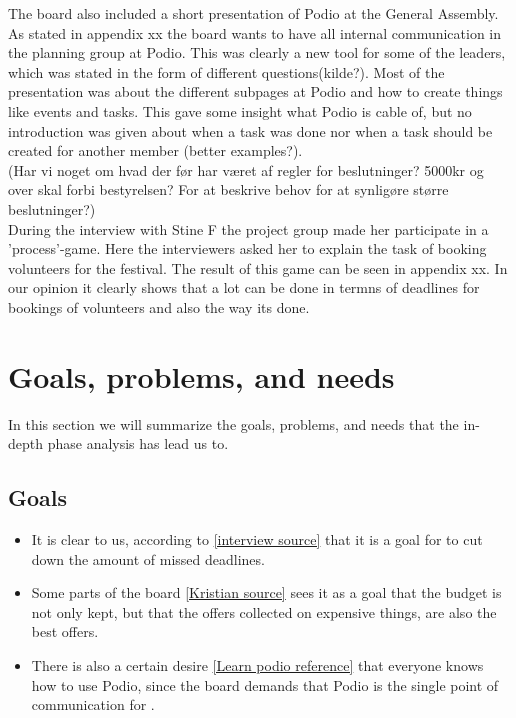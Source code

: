 The board also included a short presentation of Podio at the General Assembly. As stated in appendix xx the board wants to have all internal communication in the planning group at Podio. This was clearly a new tool for some of the leaders, which was stated in the form of different questions(kilde?). Most of the presentation was about the different subpages at Podio and how to create things like events and tasks. This gave some insight what Podio is cable of, but no introduction was given about when a task was done nor when a task should be created for another member (better examples?).\\

(Har vi noget om hvad der før har været af regler for beslutninger? 5000kr og over skal forbi bestyrelsen? For at beskrive behov for at synligøre større beslutninger?)\\

During the interview with Stine F the project group made her participate in a 'process'-game. Here the interviewers asked her to explain the task of booking volunteers for the festival. The result of this game can be seen in appendix xx. In our opinion it clearly shows that a lot can be done in termns of deadlines for bookings of volunteers and also the way its done.

\section{Goals, problems, and needs}
\label{sec:goprne}
In this section we will summarize the goals, problems, and needs that the
in-depth phase analysis has lead us to.

\subsection{Goals}
\label{subsec:goals}
\begin{itemize}
    \item It is clear to us, according to \ref{interview source} that it is a goal for \mil  to cut down
    the amount of missed deadlines.
    \item Some parts of the board \ref{Kristian source} sees it as a goal that the
    budget is not only kept, but that the offers collected on expensive things, are
    also the best offers.
    \item There is also a certain desire \ref{Learn podio reference} that everyone knows
    how to use Podio, since the board demands that Podio is the single point of
    communication for \mil.
\end{itemize}


